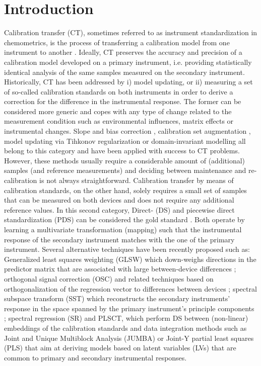 \documentclass{article}
\begin{document}
\section{Introduction}
\label{sec:introduction}
Calibration transfer (CT), sometimes referred to as instrument standardization in chemometrics, is the process of transferring a calibration model from one instrument to another \cite{Niranalysis,FEUDALE2002181,Workman:18}. Ideally, CT preserves the accuracy and precision of a calibration model developed on a primary instrument, i.e. providing statistically identical analysis of the same samples measured on the secondary instrument. Historically, CT has been addressed by i) model updating, or ii) measuring a set of so-called calibration standards on both instruments in order to derive a correction for the difference in the instrumental response. The former can be considered more generic and copes with any type of change related to the measurement condition such as environmental influences, matrix effects or instrumental changes. Slope and bias correction \cite{doi:10.1021/ac9510595}, calibration set augmentation \cite{NikzadLughoferCernudaReischerKantnerPawliczekBrandstetter18}, model updating via Tihkonov regularization \cite{doi:10.1366/000370209788701206} or domain-invariant modelling \cite{doi:10.1002/cem.2818,doi:10.1021/acs.analchem.8b00498,8999284} all belong to this category and have been applied with success to CT problems. However, these methods usually require a considerable amount of (additional) samples (and reference measurements) and deciding between maintenance and re-calibration is not always straightforward. Calibration transfer by means of calibration standards, on the other hand, solely requires a small set of samples that can be measured on both devices and does not require any additional reference values. In this second category, Direct- (DS) and piecewise direct standardization (PDS) can be considered the gold standard \cite{Wang1991}. Both operate by learning a multivariate transformation (mapping) such that the instrumental response of the secondary instrument matches with the one of the primary instrument. Several alternative techniques have been recently proposed such as: Generalized least squares weighting (GLSW) which down-weighs directions in the predictor matrix that are associated with large between-device differences \cite{wise2001calibration,doi:10.1002/cem.780}; orthogonal signal correction (OSC) and related techniques based on orthogonalization of the regression vector to differences between devices \cite{SJOBLOM1998229, IGNE200957}; spectral subspace transform (SST) which reconstructs the secondary instruments' response in the space spanned by the primary instrument's principle components \cite{DU201164}; spectral regression (SR) and PLSCT, which perform DS between (non-linear) embeddings of the calibration standards \cite{PENG20111315,Zhao2019} and data integration methods such as Joint and Unique Multiblock Analysis (JUMBA) \cite{Skotare2019} or Joint-Y partial least squares (PLS) \cite{doi:10.1002/cem.2874} that aim at deriving models based on latent variables (LVs) that are common to primary and secondary instrumental responses. 
\end{document}

